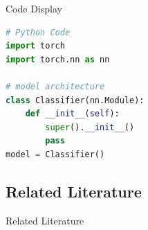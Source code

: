 \documentclass[pdf]{beamer}
\begin{document}
\begin{frame}[fragile]{Code Display}

\begin{lstlisting}[basicstyle=\normalsize, language=python]
# Python Code
import torch
import torch.nn as nn

# model architecture
class Classifier(nn.Module):
    def __init__(self):
        super().__init__()
        pass
model = Classifier()

\end{lstlisting}
    
\end{frame}



\subsection{Related Literature}

\begin{frame}{Related Literature}


\end{frame}



     
\end{document}
